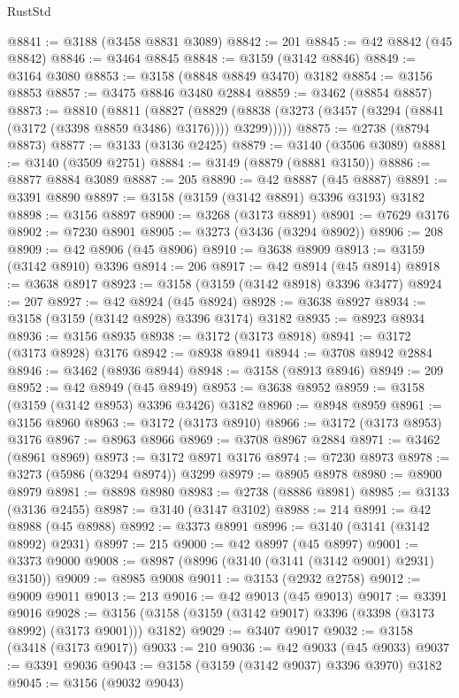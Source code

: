 \begin{lexlean}{RustStd}
\begin{coremodule}
@8841 := @3188 (@3458 @8831 @3089)
@8842 := 201
@8845 := @42 @8842 (@45 @8842)
@8846 := @3464 @8845
@8848 := @3159 (@3142 @8846)
@8849 := @3164 @3080
@8853 := @3158 (@8848 @8849 @3470) @3182
@8854 := @3156 @8853
@8857 := @3475 @8846 @3480 @2884
@8859 := @3462 (@8854 @8857)
@8873 := @8810
    (@8811
      (@8827
        (@8829 (@8838 (@3273 (@3457 (@3294 (@8841 (@3172 (@3398 @8859 @3486) @3176)))) @3299)))))
@8875 := @2738 (@8794 @8873)
@8877 := @3133 (@3136 @2425)
@8879 := @3140 (@3506 @3089)
@8881 := @3140 (@3509 @2751)
@8884 := @3149 (@8879 (@8881 @3150))
@8886 := @8877 @8884 @3089
@8887 := 205
@8890 := @42 @8887 (@45 @8887)
@8891 := @3391 @8890
@8897 := @3158 (@3159 (@3142 @8891) @3396 @3193) @3182
@8898 := @3156 @8897
@8900 := @3268 (@3173 @8891)
@8901 := @7629 @3176
@8902 := @7230 @8901
@8905 := @3273 (@3436 (@3294 @8902))
@8906 := 208
@8909 := @42 @8906 (@45 @8906)
@8910 := @3638 @8909
@8913 := @3159 (@3142 @8910) @3396
@8914 := 206
@8917 := @42 @8914 (@45 @8914)
@8918 := @3638 @8917
@8923 := @3158 (@3159 (@3142 @8918) @3396 @3477)
@8924 := 207
@8927 := @42 @8924 (@45 @8924)
@8928 := @3638 @8927
@8934 := @3158 (@3159 (@3142 @8928) @3396 @3174) @3182
@8935 := @8923 @8934
@8936 := @3156 @8935
@8938 := @3172 (@3173 @8918)
@8941 := @3172 (@3173 @8928) @3176
@8942 := @8938 @8941
@8944 := @3708 @8942 @2884
@8946 := @3462 (@8936 @8944)
@8948 := @3158 (@8913 @8946)
@8949 := 209
@8952 := @42 @8949 (@45 @8949)
@8953 := @3638 @8952
@8959 := @3158 (@3159 (@3142 @8953) @3396 @3426) @3182
@8960 := @8948 @8959
@8961 := @3156 @8960
@8963 := @3172 (@3173 @8910)
@8966 := @3172 (@3173 @8953) @3176
@8967 := @8963 @8966
@8969 := @3708 @8967 @2884
@8971 := @3462 (@8961 @8969)
@8973 := @3172 @8971 @3176
@8974 := @7230 @8973
@8978 := @3273 (@5986 (@3294 @8974)) @3299
@8979 := @8905 @8978
@8980 := @8900 @8979
@8981 := @8898 @8980
@8983 := @2738 (@8886 @8981)
@8985 := @3133 (@3136 @2455)
@8987 := @3140 (@3147 @3102)
@8988 := 214
@8991 := @42 @8988 (@45 @8988)
@8992 := @3373 @8991
@8996 := @3140 (@3141 (@3142 @8992) @2931)
@8997 := 215
@9000 := @42 @8997 (@45 @8997)
@9001 := @3373 @9000
@9008 := @8987 (@8996 (@3140 (@3141 (@3142 @9001) @2931) @3150))
@9009 := @8985 @9008
@9011 := @3153 (@2932 @2758)
@9012 := @9009 @9011
@9013 := 213
@9016 := @42 @9013 (@45 @9013)
@9017 := @3391 @9016
@9028 := @3156 (@3158 (@3159 (@3142 @9017) @3396 (@3398 (@3173 @8992) (@3173 @9001))) @3182)
@9029 := @3407 @9017
@9032 := @3158 (@3418 (@3173 @9017))
@9033 := 210
@9036 := @42 @9033 (@45 @9033)
@9037 := @3391 @9036
@9043 := @3158 (@3159 (@3142 @9037) @3396 @3970) @3182
@9045 := @3156 (@9032 @9043)

\end{coremodule}
\end{lexlean}
